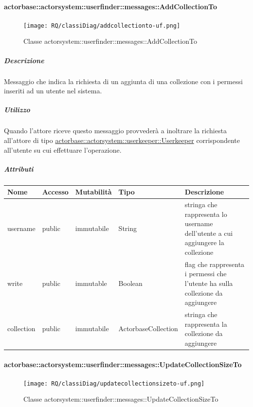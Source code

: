 \documentclass{scalatekids-article}
\begin{document}
\paragraph{actorbase::actorsystem::userfinder::messages::AddCollectionTo}
\label{sec:actorbase::actorsystem::userfinder::messages::AddCollectionTo}

\begin{figure}[H]
   \begin{center}
     \texttt{[image: RQ/classiDiag/addcollectionto-uf.png]}
     \caption{Classe actorsystem::userfinder::messages::AddCollectionTo}
   \end{center}
 \end{figure}

\subparagraph{Descrizione}
Messaggio che indica la richiesta di un aggiunta di una collezione con i permessi inseriti ad un utente nel sistema.

\subparagraph{Utilizzo}
Quando l'attore riceve questo messaggio provvederà a inoltrare la richiesta all'attore di tipo \hyperref[sec:actorbase::actorsystem::userkeeper::Userkeeper]{actorbase::\allowbreak{}actorsystem::\allowbreak{}userkeeper::\allowbreak{}Userkeeper}
corrispondente all'utente su cui effettuare l'operazione.

\subparagraph{Attributi}
\begin{tabular}{| p{3cm} | p{1.5cm} | p{2cm} | p{2cm} | p{8.5cm} |}
  \hline
  Nome & Accesso & Mutabilità & Tipo & Descrizione\\
  \hline
  username & public & immutabile & String & stringa che rappresenta lo username dell'utente a cui aggiungere la collezione \\
  \hline
  write & public & immutable & Boolean & flag che rappresenta i permessi che l'utente ha sulla collezione da aggiungere \\
  \hline
  collection & public & immutabile & ActorbaseCollection & stringa che rappresenta la collezione da aggiungere \\
  \hline
\end{tabular}

\paragraph{actorbase::actorsystem::userfinder::messages::UpdateCollectionSizeTo}
\label{sec:actorbase::actorsystem::userfinder::messages::UpdateCollectionSizeTo}

\begin{figure}[H]
   \begin{center}
     \texttt{[image: RQ/classiDiag/updatecollectionsizeto-uf.png]}
     \caption{Classe actorsystem::userfinder::messages::UpdateCollectionSizeTo}
   \end{center}
 \end{figure}
\end{document}
